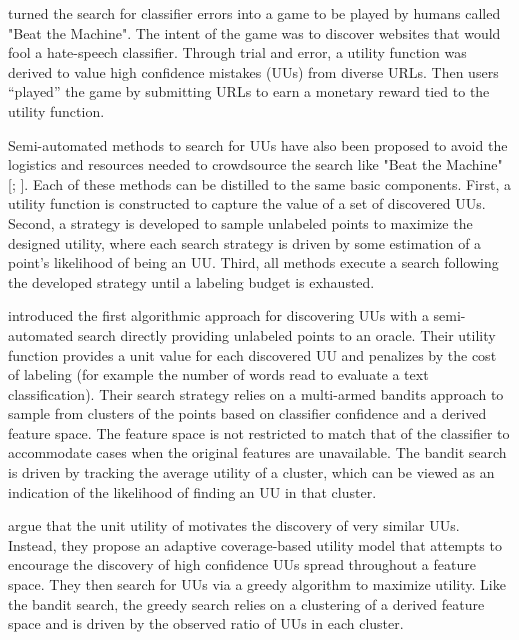 \documentclass[letterpaper]{article} %
\begin{document}
\citet{Attenberg2015} turned the search for classifier errors into a game to be played by humans called "Beat the Machine". The intent of the game was to discover websites that would fool a hate-speech classifier. Through trial and error, a utility function was derived to value high confidence mistakes (UUs) from diverse URLs. Then users ``played'' the game by submitting URLs to earn a monetary reward tied to the utility function. 

Semi-automated methods to search for UUs have also been proposed to avoid the logistics and resources needed to crowdsource the search like "Beat the Machine" [\citealt{Lakkaraju2016}; \citealt{Bansal2018}].  Each of these methods can be distilled to the same basic components.  First, a utility function is constructed to capture the value of a set of discovered UUs. Second, a strategy is developed to sample unlabeled points to maximize the designed utility, where each search strategy is driven by some estimation of a point's likelihood of being an UU.  Third, all methods execute a search following the developed strategy until a labeling budget is exhausted.

\citet{Lakkaraju2016} introduced the first algorithmic approach for discovering UUs with a semi-automated search directly providing unlabeled points to an oracle.  Their utility function provides a unit value for each discovered UU and penalizes by the cost of labeling (for example the number of words read to evaluate a text classification). Their search strategy relies on a multi-armed bandits approach to sample from clusters of the points based on classifier confidence and a derived feature space.  The feature space is not restricted to match that of the classifier to accommodate cases when the original features are unavailable.  The bandit search is driven by tracking the average utility of a cluster, which can be viewed as an indication of the likelihood of finding an UU in that cluster. 

\citet{Bansal2018} argue that the unit utility of \citet{Lakkaraju2016} motivates the discovery of very similar UUs. Instead, they propose an adaptive coverage-based utility model that attempts to encourage the discovery of high confidence UUs spread throughout a feature space. They then search for UUs via a greedy algorithm to maximize utility.  Like the bandit search, the greedy search relies on a clustering of a derived feature space and is driven by the observed ratio of UUs in each cluster. 
\end{document}
